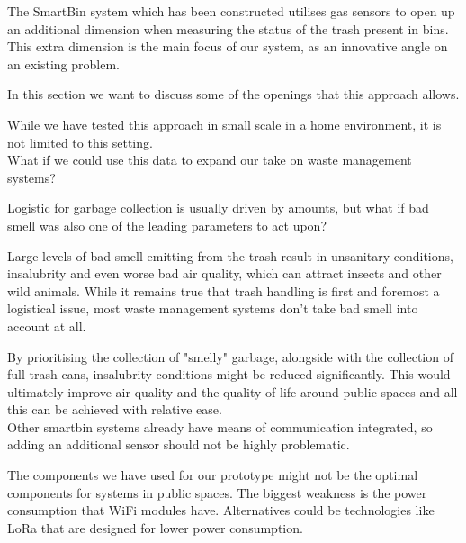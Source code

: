 \iffalse
discussion

here emphasize  about the famous What IF question

take this INNOVATIVE aspect and use it in waste management

in the conclusion:
we can build it, it works, the technology is out there
in the discussion:
it can be applied somewhere else
it can extend other systems
used for innovation
it's a different take
\fi

The SmartBin system which has been constructed utilises gas sensors to open up an additional dimension when measuring the status of the trash present in bins.
This extra dimension is the main focus of our system, as an innovative angle on an existing problem.

In this section we want to discuss some of the openings that this approach allows.

While we have tested this approach in small scale in a home environment, it is not limited to this setting.\\
What if we could use this data to expand our take on waste management systems?

Logistic for garbage collection is usually driven by amounts, but what if bad smell was also one of the leading parameters to act upon?

Large levels of bad smell emitting from the trash result in unsanitary conditions, insalubrity and even worse bad air quality, which can attract insects and other wild animals.
While it remains true that trash handling is first and foremost a logistical issue, most waste management systems don't take bad smell into account at all.

By prioritising the collection of "smelly" garbage, alongside with the collection of full trash cans, insalubrity conditions might be reduced significantly.
This would ultimately improve air quality and the quality of life around public spaces and all this can be achieved with relative ease.\\
Other smartbin systems already have means of communication integrated, so adding an additional sensor should not be highly problematic.

The components we have used for our prototype might not be the optimal components for systems in public spaces.
The biggest weakness is the power consumption that WiFi modules have. Alternatives could be technologies like LoRa that are designed for lower power consumption.
 


